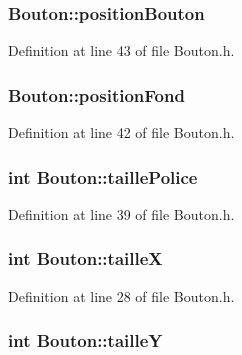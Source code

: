 \subsubsection[{position\+Bouton}]{ Bouton\+::position\+Bouton}\label{class_bouton_a0f5cf4db7a478cd25d6939585a38b1ec}


Definition at line 43 of file Bouton.\+h.

\hypertarget{class_bouton_af3cd11a5cba70dc2f12c0d993e7e06c1}{}
\subsubsection[{position\+Fond}]{ Bouton\+::position\+Fond}\label{class_bouton_af3cd11a5cba70dc2f12c0d993e7e06c1}


Definition at line 42 of file Bouton.\+h.

\hypertarget{class_bouton_a5e552b3de0165eb901e0c0d5e44d3efe}{}
\subsubsection[{taille\+Police}]{\setlength{\rightskip}{0pt plus 5cm}int Bouton\+::taille\+Police}\label{class_bouton_a5e552b3de0165eb901e0c0d5e44d3efe}


Definition at line 39 of file Bouton.\+h.

\hypertarget{class_bouton_a4c73aa4a6e96eaae8a1d3a63c8dac983}{}
\subsubsection[{taille\+X}]{\setlength{\rightskip}{0pt plus 5cm}int Bouton\+::taille\+X}\label{class_bouton_a4c73aa4a6e96eaae8a1d3a63c8dac983}


Definition at line 28 of file Bouton.\+h.

\hypertarget{class_bouton_a9f5d708b5c06847453b088e788538665}{}
\subsubsection[{taille\+Y}]{\setlength{\rightskip}{0pt plus 5cm}int Bouton\+::taille\+Y}\label{class_bouton_a9f5d708b5c06847453b088e788538665}


